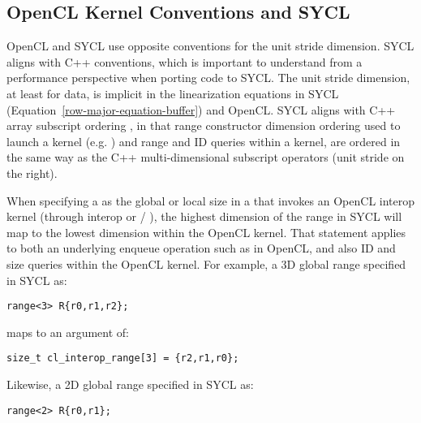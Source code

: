 \subsection{OpenCL Kernel Conventions and SYCL}
\label{sec:opencl_kern_conventions_and_sycl}

OpenCL and SYCL use opposite conventions for the unit stride dimension.  SYCL
aligns with C++ conventions, which is important to understand from a performance
perspective when porting code to SYCL.  The unit stride dimension, at least for data, is implicit in the
linearization equations in SYCL (Equation~\ref{row-major-equation-buffer}) and OpenCL.  SYCL aligns with C++ array subscript ordering
, in that range constructor dimension ordering used to launch a kernel
(e.g. ) and range and ID queries within a kernel, are ordered in
the same way as the C++ multi-dimensional subscript operators (unit stride on the right).

When specifying a  as the global or local size
in a  that invokes an OpenCL interop kernel (through
 interop or /
),
the highest dimension of the range in SYCL will map to the
lowest dimension within the OpenCL kernel.  That statement applies to both
an underlying enqueue operation such as 
in OpenCL, and also ID and size queries within the OpenCL kernel.
For example, a 3D global range specified in SYCL as:

\begin{lstlisting}[style=nonumbers]
range<3> R{r0,r1,r2};
\end{lstlisting}

maps to an   argument
of:

\begin{lstlisting}[style=nonumbers]
size_t cl_interop_range[3] = {r2,r1,r0};
\end{lstlisting}

Likewise, a 2D global range specified in SYCL as:

\begin{lstlisting}[style=nonumbers]
range<2> R{r0,r1};
\end{lstlisting}

